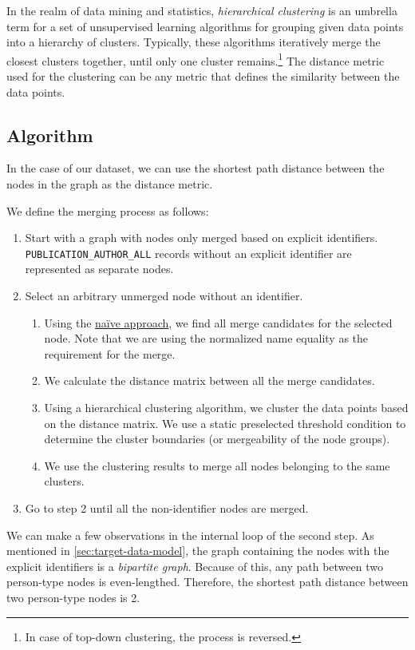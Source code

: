 In the realm of data mining and statistics, \textit{hierarchical clustering} is an umbrella term for a set of unsupervised learning algorithms for grouping
given data points into a hierarchy of clusters. Typically, these algorithms iteratively merge the closest clusters together, until only one cluster remains.\footnote{In case of top-down clustering, the process is reversed.}
The distance metric used for the clustering can be any metric that defines the similarity between the data points.

\subsection{Algorithm}\label{sec:distance-based-hierarchical-clustering}

In the case of our dataset, we can use the shortest path distance between the nodes in the graph as the distance metric.

We define the merging process as follows:

\begin{enumerate}
    \item Start with a graph with nodes only merged based on explicit identifiers. \texttt{PUBLICATION\_AUTHOR\_ALL} records without an explicit identifier are represented as separate nodes.
    \item Select an arbitrary unmerged node without an identifier.
    \begin{enumerate}
        \item Using the \hyperref[sec:naive-approach]{naïve approach}, we find all merge candidates for the selected node. Note that we are using the normalized name equality as the requirement for the merge.
        \item We calculate the distance matrix between all the merge candidates.
        \item Using a hierarchical clustering algorithm, we cluster the data points based on the distance matrix. 
        We use a static preselected threshold condition to determine the cluster boundaries (or mergeability of the node groups).
        \item We use the clustering results to merge all nodes belonging to the same clusters.
    \end{enumerate}
    \item Go to step 2 until all the non-identifier nodes are merged.
\end{enumerate}

We can make a few observations in the internal loop of the second step.
As mentioned in \ref{sec:target-data-model}, the graph containing the nodes with the explicit identifiers is a \textit{bipartite graph}.
Because of this, any path between two person-type nodes is even-lengthed.
Therefore, the shortest path distance between two person-type nodes is 2.

